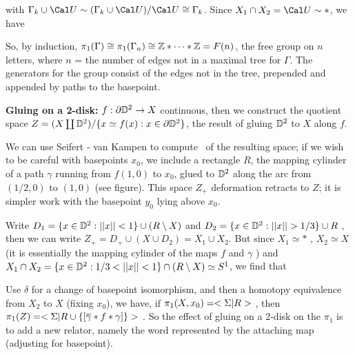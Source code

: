 \ssk

with $\Gamma_{k}\cup{\Cal U}\sim (\Gamma_{k}\cup{\Cal U})/{\Cal U}\cong \Gamma_{k}$. 
Since $X_1\cap X_2={\Cal U}\sim *$, we have 


So, by induction, $\pi_1(\Gamma) \cong \pi_1(\Gamma_{n})\cong {\Bbb Z}*\cdots *{\Bbb Z} = F(n)$, 
the free group on $n$ letters, where $n$ = the number of edges not in a maximal tree for $\Gamma$. 
The generators for the group consist of the
edges not in the tree, prepended and appended by paths to the basepoint.

\vfill
\eject

{\bf Gluing on a 2-disk:} $f:\partial {\Bbb D}^2\rightarrow X$ continuous, then we
construct the quotient space $Z=(X\coprod {\Bbb D}^2)/\{x\simeq f(x) : x\in\partial{\Bbb D}^2\}$,
the result of gluing ${\Bbb D}^2$ to $X$ along $f$. 

\ssk

We can use Seifert - van Kampen to compute \mpu\ of the resulting space; if we
wish to be careful with basepoints $x_0$,
we include a rectangle $R$, the mapping cylinder of a path $\gamma$ running from 
$f(1,0)$ to $x_0$, glued to 
${\Bbb D}^2$ along the arc from $(1/2,0)$ to $(1,0)$ (see figure). 
This space $Z_+$ deformation retracts to $Z$; it
is simpler work with the basepoint $y_0$ lying above $x_0$.

\ssk

Write $D_1 = \{x\in {\Bbb D}^2 : ||x||<1\}\cup(R\setminus X)$ 
and $D_2 = \{x\in {\Bbb D}^2 : ||x||>1/3\}\cup R$ , 
then we can write $Z_+=D_+\cup(X\cup D_2) = X_1\cup X_2$.
But since $X_1\simeq *$ , $X_2\simeq X$ 
(it is essentially the mapping cylinder of the maps $f$ and $\gamma$ )
and $X_1\cap X_2 = \{x\in {\Bbb D}^2 : 1/3<||x||<1\}\cap(R\setminus X)\simeq S^1$, 
we find that 


Use $\delta$ for a change of basepoint isomorphism, and then a homotopy
equivalence from $X_2$ to $X$ (fixing $x_0$), we have, 
if $\pi_1(X,x_0)=<\Sigma | R>$ , then $\pi_1(Z) = <\Sigma | R\cup\{[\overline{\gamma}*f*\gamma]\}>$ . 
So the effect of gluing on a 2-disk on the $\pi_1$ is to add a new relator, 
namely the word represented by the attaching map (adjusting for basepoint).

\msk


